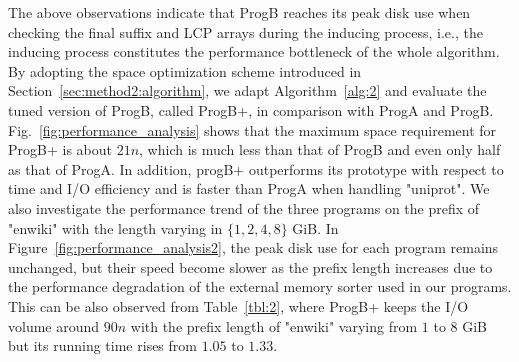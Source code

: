 \documentclass[10pt,journal,compsoc]{IEEEtran}
\begin{document}
The above observations indicate that ProgB reaches its peak disk use when checking the final suffix and LCP arrays during the inducing process, i.e., the inducing process constitutes the performance bottleneck of the whole algorithm. By adopting the space optimization scheme introduced in Section~\ref{sec:method2:algorithm}, we adapt Algorithm~\ref{alg:2} and evaluate the tuned version of ProgB, called ProgB+, in comparison with ProgA and ProgB. Fig.~\ref{fig:performance_analysis} shows that the maximum space requirement for ProgB+ is about $21n$, which is much less than that of ProgB and even only half as that of ProgA. In addition, progB+ outperforms its prototype with respect to time and I/O efficiency and is faster than ProgA when handling "uniprot". We also investigate the performance trend of the three programs on the prefix of "enwiki" with the length varying in $\{1, 2, 4, 8\}$ GiB. In Figure~\ref{fig:performance_analysis2}, the peak disk use for each program remains unchanged, but their speed become slower as the prefix length increases due to the performance degradation of the external memory sorter used in our programs. This can be also observed from Table~\ref{tbl:2}, where ProgB+ keeps the I/O volume around $90n$ with the prefix length of "enwiki" varying from $1$ to $8$ GiB but its running time rises from $1.05$ to $1.33$.
\end{document}
